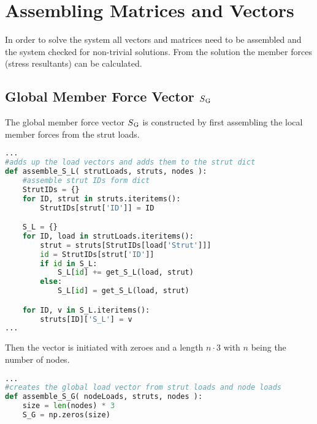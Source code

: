 \section{Assembling Matrices and Vectors}
\label{sec:asmmatrvec}

In order to solve the system all vectors and matrices need to be assembled and the system checked for non-trivial solutions.
From the solution the member forces (stress resultants) can be calculated.

\subsection{Global Member Force Vector $S\textsubscript{G}$}
\label{sec:asmSGZ}

The global member force vector $S\textsubscript{G}$ is constructed by first assembling the local member forces from the strut loads.

\begin{inconsolata}
\begin{minipage}{\linewidth}
\begin{lstlisting}[language=python]
...
#adds up the load vectors and adds them to the strut dict
def assemble_S_L( strutLoads, struts, nodes ):
    #assemble strut IDs form dict
    StrutIDs = {}
    for ID, strut in struts.iteritems():
        StrutIDs[strut['ID']] = ID

    S_L = {}
    for ID, load in strutLoads.iteritems():
        strut = struts[StrutIDs[load['Strut']]]
        id = StrutIDs[strut['ID']]
        if id in S_L:
            S_L[id] += get_S_L(load, strut)
        else:
            S_L[id] = get_S_L(load, strut)

    for ID, v in S_L.iteritems():
        struts[ID]['S_L'] = v
...
\end{lstlisting}
\end{minipage}
\end{inconsolata}

Then the vector is initiated with zeroes and a length $n \cdot 3$ with $n$ being the number of nodes.

\begin{inconsolata}
\begin{minipage}{\linewidth}
\begin{lstlisting}[language=python]
...
#creates the global load vector from strut loads and node loads
def assemble_S_G( nodeLoads, struts, nodes ):
    size = len(nodes) * 3
    S_G = np.zeros(size)
\end{lstlisting}
\end{minipage}
\end{inconsolata}

